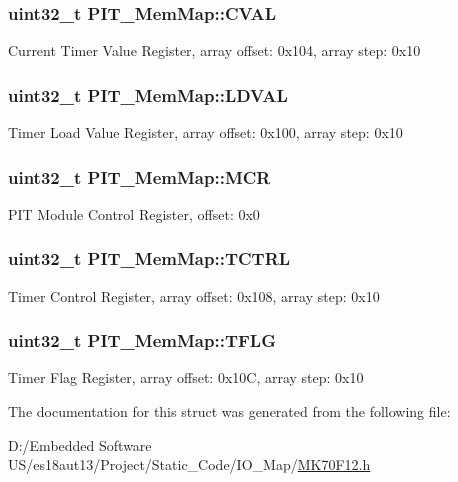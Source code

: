 \subsubsection[{C\+V\+A\+L}]{\setlength{\rightskip}{0pt plus 5cm}uint32\+\_\+t P\+I\+T\+\_\+\+Mem\+Map\+::\+C\+V\+A\+L}\label{struct_p_i_t___mem_map_a7d3d1a5913a28cfb4ca0e120ebf37087}
Current Timer Value Register, array offset\+: 0x104, array step\+: 0x10 \hypertarget{struct_p_i_t___mem_map_ad664bbe0f8b53ee1e533727db4da3fb2}{}
\subsubsection[{L\+D\+V\+A\+L}]{\setlength{\rightskip}{0pt plus 5cm}uint32\+\_\+t P\+I\+T\+\_\+\+Mem\+Map\+::\+L\+D\+V\+A\+L}\label{struct_p_i_t___mem_map_ad664bbe0f8b53ee1e533727db4da3fb2}
Timer Load Value Register, array offset\+: 0x100, array step\+: 0x10 \hypertarget{struct_p_i_t___mem_map_a99390c5764693e07c37d40ead441a7a4}{}
\subsubsection[{M\+C\+R}]{\setlength{\rightskip}{0pt plus 5cm}uint32\+\_\+t P\+I\+T\+\_\+\+Mem\+Map\+::\+M\+C\+R}\label{struct_p_i_t___mem_map_a99390c5764693e07c37d40ead441a7a4}
P\+I\+T Module Control Register, offset\+: 0x0 \hypertarget{struct_p_i_t___mem_map_a567cdea5c7d615341f95f1438020a7e1}{}
\subsubsection[{T\+C\+T\+R\+L}]{\setlength{\rightskip}{0pt plus 5cm}uint32\+\_\+t P\+I\+T\+\_\+\+Mem\+Map\+::\+T\+C\+T\+R\+L}\label{struct_p_i_t___mem_map_a567cdea5c7d615341f95f1438020a7e1}
Timer Control Register, array offset\+: 0x108, array step\+: 0x10 \hypertarget{struct_p_i_t___mem_map_add88e740d4ec7a83e66cf9ad79cd027a}{}
\subsubsection[{T\+F\+L\+G}]{\setlength{\rightskip}{0pt plus 5cm}uint32\+\_\+t P\+I\+T\+\_\+\+Mem\+Map\+::\+T\+F\+L\+G}\label{struct_p_i_t___mem_map_add88e740d4ec7a83e66cf9ad79cd027a}
Timer Flag Register, array offset\+: 0x10\+C, array step\+: 0x10 

The documentation for this struct was generated from the following file\+:\begin{DoxyCompactItemize}
\item 
D\+:/\+Embedded Software U\+S/es18aut13/\+Project/\+Static\+\_\+\+Code/\+I\+O\+\_\+\+Map/\hyperlink{_m_k70_f12_8h}{M\+K70\+F12.\+h}\end{DoxyCompactItemize}
